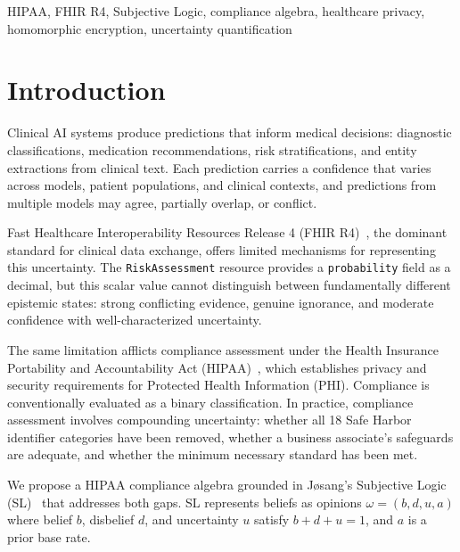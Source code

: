 \documentclass[conference]{IEEEtran}
\begin{document}
\begin{IEEEkeywords}
HIPAA, FHIR R4, Subjective Logic, compliance algebra, healthcare privacy, homomorphic encryption, uncertainty quantification
\end{IEEEkeywords}

\section{Introduction}

Clinical AI systems produce predictions that inform medical decisions: diagnostic classifications, medication recommendations, risk stratifications, and entity extractions from clinical text. Each prediction carries a confidence that varies across models, patient populations, and clinical contexts, and predictions from multiple models may agree, partially overlap, or conflict.

Fast Healthcare Interoperability Resources Release 4 (FHIR R4)~\cite{hl7fhirr4}, the dominant standard for clinical data exchange, offers limited mechanisms for representing this uncertainty. The \texttt{RiskAssessment} resource provides a \texttt{probability} field as a decimal, but this scalar value cannot distinguish between fundamentally different epistemic states: strong conflicting evidence, genuine ignorance, and moderate confidence with well-characterized uncertainty.

The same limitation afflicts compliance assessment under the Health Insurance Portability and Accountability Act (HIPAA)~\cite{hipaa_privacy}, which establishes privacy and security requirements for Protected Health Information (PHI). Compliance is conventionally evaluated as a binary classification. In practice, compliance assessment involves compounding uncertainty: whether all 18 Safe Harbor identifier categories have been removed, whether a business associate's safeguards are adequate, and whether the minimum necessary standard has been met.

We propose a HIPAA compliance algebra grounded in J{\o}sang's Subjective Logic (SL)~\cite{josang2016subjective} that addresses both gaps. SL represents beliefs as opinions $\omega = (b, d, u, a)$ where belief $b$, disbelief $d$, and uncertainty $u$ satisfy $b + d + u = 1$, and $a$ is a prior base rate.
\end{document}
